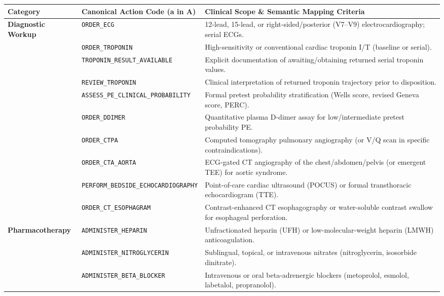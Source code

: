 \documentclass[10pt,a4paper]{article}
\begin{document}
{\scriptsize\setlength{\tabcolsep}{3pt}\begin{longtable}{p{}p{}p{}}\toprule
Category & Canonical Action Code (a in A) & Clinical Scope \& Semantic Mapping Criteria \\
\midrule
\textbf{Diagnostic Workup} & \texttt{ORDER\_\allowbreak{}ECG} & 12-lead, 15-lead, or right-sided/posterior (V7--V9) electrocardiography; serial ECGs. \\
 & \texttt{ORDER\_\allowbreak{}TROPONIN} & High-sensitivity or conventional cardiac troponin I/T (baseline or serial). \\
 & \texttt{TROPONIN\_\allowbreak{}RESULT\_\allowbreak{}AVAILABLE} & Explicit documentation of awaiting/obtaining returned serial troponin values. \\
 & \texttt{REVIEW\_\allowbreak{}TROPONIN} & Clinical interpretation of returned troponin trajectory prior to disposition. \\
 & \texttt{ASSESS\_\allowbreak{}PE\_\allowbreak{}CLINICAL\_\allowbreak{}PROBABILITY} & Formal pretest probability stratification (Wells score, revised Geneva score, PERC). \\
 & \texttt{ORDER\_\allowbreak{}DDIMER} & Quantitative plasma D-dimer assay for low/intermediate pretest probability PE. \\
 & \texttt{ORDER\_\allowbreak{}CTPA} & Computed tomography pulmonary angiography (or V/Q scan in specific contraindications). \\
 & \texttt{ORDER\_\allowbreak{}CTA\_\allowbreak{}AORTA} & ECG-gated CT angiography of the chest/abdomen/pelvis (or emergent TEE) for aortic syndrome. \\
 & \texttt{PERFORM\_\allowbreak{}BEDSIDE\_\allowbreak{}ECHOCARDIOGRAPHY} & Point-of-care cardiac ultrasound (POCUS) or formal transthoracic echocardiogram (TTE). \\
 & \texttt{ORDER\_\allowbreak{}CT\_\allowbreak{}ESOPHAGRAM} & Contrast-enhanced CT esophagography or water-soluble contrast swallow for esophageal perforation. \\
\textbf{Pharmacotherapy} & \texttt{ADMINISTER\_\allowbreak{}HEPARIN} & Unfractionated heparin (UFH) or low-molecular-weight heparin (LMWH) anticoagulation. \\
 & \texttt{ADMINISTER\_\allowbreak{}NITROGLYCERIN} & Sublingual, topical, or intravenous nitrates (nitroglycerin, isosorbide dinitrate). \\
 & \texttt{ADMINISTER\_\allowbreak{}BETA\_\allowbreak{}BLOCKER} & Intravenous or oral beta-adrenergic blockers (metoprolol, esmolol, labetalol, propranolol). \\

\end{longtable}}
\end{document}
